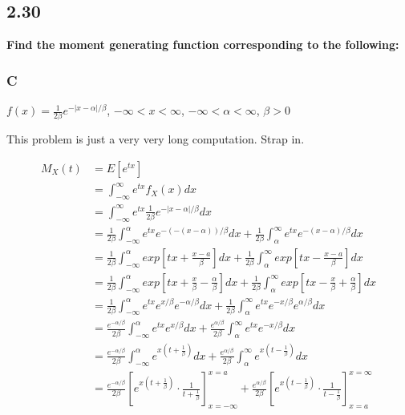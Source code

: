 \subsection*{2.30}

\textbf{Find the moment generating function corresponding to the following:}

\subsubsection*{C}

$f(x) = \frac{1}{2\beta}e^{-|x-\alpha|/\beta}$, $-\infty < x < \infty$,  $-\infty < \alpha < \infty$, $\beta > 0$

This problem is just a very very long computation. Strap in.

\begin{align*}
	M_X(t) &= E[e^{tx}] \\
	&= \int_{-\infty}^{\infty} e^{tx} f_X(x) dx \\
	&= \int_{-\infty}^{\infty} e^{tx} \frac{1}{2\beta}e^{-|x-\alpha|/\beta} dx \\
	&= \frac{1}{2\beta} \int_{-\infty}^{\alpha} e^{tx} e^{-( -(x-\alpha ))/\beta} dx + \frac{1}{2\beta}\int_{\alpha}^{\infty} e^{tx} e^{-(x-\alpha )/\beta} dx \\
	&= \frac{1}{2\beta} \int_{-\infty}^{\alpha} exp\left[ tx + \frac{x-a}{\beta} \right] dx +  \frac{1}{2\beta} \int^{\infty}_{\alpha} exp\left[ tx - \frac{x-a}{\beta} \right] dx \\
	&= \frac{1}{2\beta} \int_{-\infty}^{\alpha} exp\left[ tx + \frac{x}{\beta} - \frac{\alpha}{\beta} \right] dx + \frac{1}{2\beta} \int^{\infty}_{\alpha} exp\left[ tx - \frac{x}{\beta} + \frac{\alpha}{\beta} \right] dx \\
	&= \frac{1}{2\beta} \int_{-\infty}^{\alpha} e^{tx}e^{x/\beta}e^{-\alpha/\beta} dx + \frac{1}{2\beta} \int^{\infty}_{\alpha}  e^{tx}e^{-x/\beta}e^{\alpha/\beta} dx \\
	&= \frac{e^{-\alpha/\beta}}{2\beta} \int_{-\infty}^{\alpha} e^{tx}e^{x/\beta} dx + \frac{e^{\alpha/\beta}}{2\beta} \int^{\infty}_{\alpha} e^{tx}e^{-x/\beta} dx \\
	&= \frac{e^{-\alpha/\beta}}{2\beta} \int_{-\infty}^{\alpha} e^{x(t+\frac{1}{\beta})} dx + \frac{e^{\alpha/\beta}}{2\beta} \int^{\infty}_{\alpha} e^{x(t-\frac{1}{\beta})} dx \\
	&= \frac{e^{-\alpha/\beta}}{2\beta} \left[ e^{x(t + \frac{1}{\beta})} \cdot \frac{1}{t + \frac{1}{\beta}} \right]_{x=-\infty}^{x=a}
	+ \frac{e^{\alpha/\beta}}{2\beta} \left[ e^{x(t - \frac{1}{\beta})} \cdot \frac{1}{t - \frac{1}{\beta}} \right]^{x=\infty}_{x=a} \\

\end{align*}
